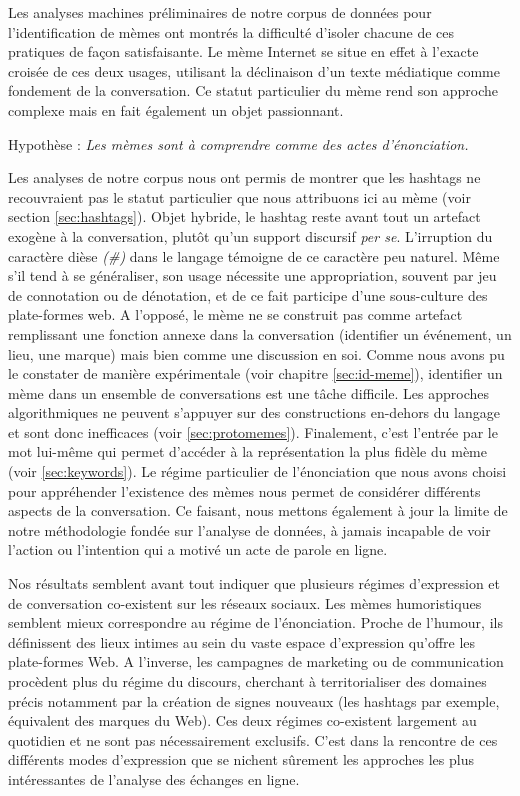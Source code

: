 Les analyses machines préliminaires de notre corpus de données pour l'identification de mèmes ont montrés la difficulté d'isoler chacune de ces pratiques de façon satisfaisante. Le mème Internet se situe en effet à l'exacte croisée de ces deux usages, utilisant la déclinaison d'un texte médiatique comme fondement de la conversation. Ce statut particulier du mème rend son approche complexe mais en fait également un objet passionnant. 

Hypothèse : \textit{Les mèmes sont à comprendre comme des actes d'énonciation.}

Les analyses de notre corpus nous ont permis de montrer que les hashtags ne recouvraient pas le statut particulier que nous attribuons ici au mème (voir section \ref{sec:hashtags}). Objet hybride, le hashtag reste avant tout un artefact exogène à la conversation, plutôt qu'un support discursif \textit{per se}. L'irruption du caractère dièse \textit{(\#)} dans le langage témoigne de ce caractère peu naturel. Même s'il tend à se généraliser, son usage nécessite une appropriation, souvent par jeu de connotation ou de dénotation, et de ce fait participe d'une sous-culture des plate-formes web. A l'opposé, le mème ne se construit pas comme artefact remplissant une fonction annexe dans la conversation (identifier un événement, un lieu, une marque) mais bien comme une discussion en soi. Comme nous avons pu le constater de manière expérimentale (voir chapitre \ref{sec:id-meme}), identifier un mème dans un ensemble de conversations est une tâche difficile. Les approches algorithmiques ne peuvent s'appuyer sur des constructions en-dehors du langage et sont donc inefficaces (voir \ref{sec:protomemes}). Finalement, c'est l'entrée par le mot lui-même qui permet d'accéder à la représentation la plus fidèle du mème (voir \ref{sec:keywords}). Le régime particulier de l'énonciation que nous avons choisi pour appréhender l'existence des mèmes nous permet de considérer différents aspects de la conversation. Ce faisant, nous mettons également à jour la limite de notre méthodologie fondée sur l'analyse de données, à jamais incapable de voir l'action ou l'intention qui a motivé un acte de parole en ligne. 

Nos résultats semblent avant tout indiquer que plusieurs régimes d'expression et de conversation co-existent sur les réseaux sociaux. Les mèmes humoristiques semblent mieux correspondre au régime de l'énonciation. Proche de l'humour, ils définissent des lieux intimes au sein du vaste espace d'expression qu'offre les plate-formes Web. A l'inverse, les campagnes de marketing ou de communication procèdent plus du régime du discours, cherchant à territorialiser des domaines précis notamment par la création de signes nouveaux (les hashtags par exemple, équivalent des marques du Web). Ces deux régimes co-existent largement au quotidien et ne sont pas nécessairement exclusifs. C'est dans la rencontre de ces différents modes d'expression que se nichent sûrement les approches les plus intéressantes de l'analyse des échanges en ligne.

